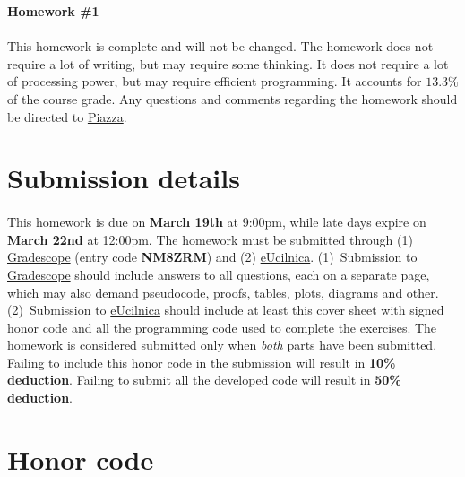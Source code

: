 \documentclass[11pt,a4paper]{article}
\begin{document}
 

\thispagestyle{titlestyle}

\vspace*{0.05in} 
\begin{center} 
	{\huge\bf Homework {\color{magenta}\#1}} 
\end{center} 
\vspace*{0.05in} 

\paragraph{} This homework is complete and will not be changed. The homework does not require a lot of writing, but may require some thinking. It does not require a lot of processing power, but may require efficient programming. It accounts for $13.3\%$ of the course grade. Any questions and comments regarding the homework should be directed to \href{https://piazza.com/class/kkn1oz577n2sq}{Piazza}.

\section*{Submission details}

\paragraph{} This homework is due on {\bf\color{magenta} March 19th} at 9:00pm, while late days expire on {\bf\color{magenta} March 22nd} at 12:00pm. The homework must be submitted through (1) \href{https://www.gradescope.com}{Gradescope} (entry code {\bf NM8ZRM}) and (2) \href{https://ucilnica.fri.uni-lj.si/mod/assign/view.php?id=42257}{eUcilnica}. (1)~Submission to \href{https://www.gradescope.com}{Gradescope} should include answers to all questions, each on a separate page, which may also demand pseudocode, proofs, tables, plots, diagrams and other. (2)~Submission to \href{https://ucilnica.fri.uni-lj.si/mod/assign/view.php?id=42257}{eUcilnica} should include at least this cover sheet with signed honor code and all the programming code used to complete the exercises. The homework is considered submitted only when \textit{both} parts have been submitted. Failing to include this honor code in the submission will result in {\bf\color{LimeGreen} 10\% deduction}. Failing to submit all the developed code will result in {\bf\color{LimeGreen} 50\% deduction}.

\section*{Honor code}
\end{document}
